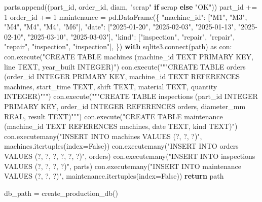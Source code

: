 \documentclass[
  letterpaper,
  DIV=11,
  numbers=noendperiod]{scrreprt}
\newenvironment{Shaded}{\begin{snugshade}}{\end{snugshade}}
\newcommand{\ControlFlowTok}[1]{\textcolor[rgb]{0.00,0.23,0.31}{\textbf{#1}}}
\newcommand{\DecValTok}[1]{\textcolor[rgb]{0.68,0.00,0.00}{#1}}
\newcommand{\ExtensionTok}[1]{\textcolor[rgb]{0.00,0.23,0.31}{#1}}
\newcommand{\ImportTok}[1]{\textcolor[rgb]{0.00,0.46,0.62}{#1}}
\newcommand{\NormalTok}[1]{\textcolor[rgb]{0.00,0.23,0.31}{#1}}
\newcommand{\OperatorTok}[1]{\textcolor[rgb]{0.37,0.37,0.37}{#1}}
\newcommand{\StringTok}[1]{\textcolor[rgb]{0.13,0.47,0.30}{#1}}
\newcommand{\VariableTok}[1]{\textcolor[rgb]{0.07,0.07,0.07}{#1}}
\begin{document}
\begin{Shaded}
\begin{Highlighting}[]
\NormalTok{                    parts.append((part\_id, order\_id, diam, }\StringTok{"scrap"} \ControlFlowTok{if}\NormalTok{ scrap }\ControlFlowTok{else} \StringTok{"OK"}\NormalTok{))}
\NormalTok{                    part\_id }\OperatorTok{+=} \DecValTok{1}
\NormalTok{            order\_id }\OperatorTok{+=} \DecValTok{1}
\NormalTok{    maintenance }\OperatorTok{=}\NormalTok{ pd.DataFrame(\{}
        \StringTok{"machine\_id"}\NormalTok{: [}\StringTok{"M1"}\NormalTok{, }\StringTok{"M3"}\NormalTok{, }\StringTok{"M4"}\NormalTok{, }\StringTok{"M4"}\NormalTok{, }\StringTok{"M4"}\NormalTok{, }\StringTok{"M6"}\NormalTok{],}
        \StringTok{"date"}\NormalTok{: [}\StringTok{"2025{-}01{-}20"}\NormalTok{, }\StringTok{"2025{-}02{-}03"}\NormalTok{, }\StringTok{"2025{-}01{-}13"}\NormalTok{, }\StringTok{"2025{-}02{-}10"}\NormalTok{, }\StringTok{"2025{-}03{-}10"}\NormalTok{, }\StringTok{"2025{-}03{-}03"}\NormalTok{],}
        \StringTok{"kind"}\NormalTok{: [}\StringTok{"inspection"}\NormalTok{, }\StringTok{"repair"}\NormalTok{, }\StringTok{"repair"}\NormalTok{, }\StringTok{"repair"}\NormalTok{, }\StringTok{"inspection"}\NormalTok{, }\StringTok{"inspection"}\NormalTok{],}
\NormalTok{    \})}
    \ControlFlowTok{with}\NormalTok{ sqlite3.}\ExtensionTok{connect}\NormalTok{(path) }\ImportTok{as}\NormalTok{ con:}
\NormalTok{        con.execute(}\StringTok{"CREATE TABLE machines (machine\_id TEXT PRIMARY KEY, line TEXT, year\_built INTEGER)"}\NormalTok{)}
\NormalTok{        con.execute(}\StringTok{"""CREATE TABLE orders (order\_id INTEGER PRIMARY KEY, machine\_id TEXT REFERENCES machines,}
\StringTok{                       start\_time TEXT, shift TEXT, material TEXT, quantity INTEGER)"""}\NormalTok{)}
\NormalTok{        con.execute(}\StringTok{"""CREATE TABLE inspections (part\_id INTEGER PRIMARY KEY, order\_id INTEGER REFERENCES orders,}
\StringTok{                       diameter\_mm REAL, result TEXT)"""}\NormalTok{)}
\NormalTok{        con.execute(}\StringTok{"CREATE TABLE maintenance (machine\_id TEXT REFERENCES machines, date TEXT, kind TEXT)"}\NormalTok{)}
\NormalTok{        con.executemany(}\StringTok{"INSERT INTO machines VALUES (?, ?, ?)"}\NormalTok{, machines.itertuples(index}\OperatorTok{=}\VariableTok{False}\NormalTok{))}
\NormalTok{        con.executemany(}\StringTok{"INSERT INTO orders VALUES (?, ?, ?, ?, ?, ?)"}\NormalTok{, orders)}
\NormalTok{        con.executemany(}\StringTok{"INSERT INTO inspections VALUES (?, ?, ?, ?)"}\NormalTok{, parts)}
\NormalTok{        con.executemany(}\StringTok{"INSERT INTO maintenance VALUES (?, ?, ?)"}\NormalTok{, maintenance.itertuples(index}\OperatorTok{=}\VariableTok{False}\NormalTok{))}
    \ControlFlowTok{return}\NormalTok{ path}

\NormalTok{db\_path }\OperatorTok{=}\NormalTok{ create\_production\_db()}
\end{Highlighting}
\end{Shaded}
\end{document}

